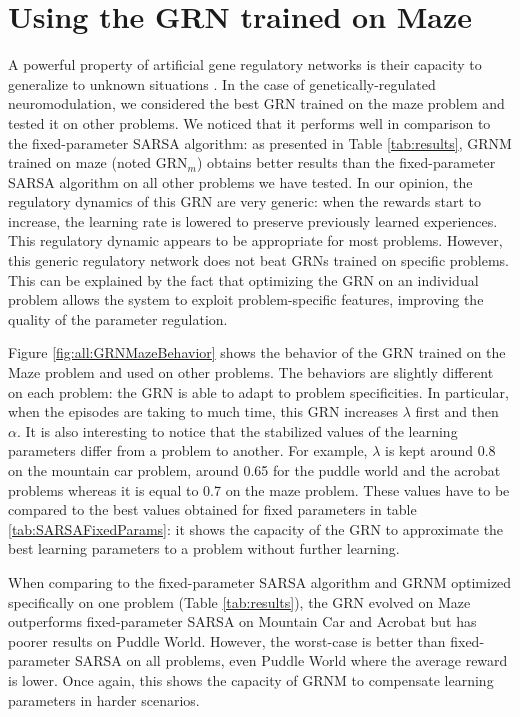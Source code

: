 \section{Using the GRN trained on Maze}
A powerful property of artificial gene regulatory networks is their capacity to generalize to unknown situations \cite{sanchez2014gene}. In the case of genetically-regulated neuromodulation, we considered the best GRN trained on the maze problem and tested it on other problems. We noticed that it performs well in comparison to the fixed-parameter SARSA algorithm: as presented in Table \ref{tab:results}, GRNM trained on maze (noted GRN$_{m}$) obtains better results than the fixed-parameter SARSA algorithm on all other problems we have tested. In our opinion, the regulatory dynamics of this GRN are very generic: when the rewards start to increase, the learning rate is lowered to preserve previously learned experiences. This regulatory dynamic appears to be appropriate for most problems. However, this generic regulatory network does not beat GRNs trained on specific problems. This can be explained by the fact that optimizing the GRN on an individual problem allows the system to exploit problem-specific features, improving the quality of the parameter regulation.

Figure \ref{fig:all:GRNMazeBehavior} shows the behavior of the GRN trained on the Maze problem and used on other problems. The behaviors are slightly different on each problem: the GRN is able to adapt to problem specificities. In particular, when the episodes are taking to much time, this GRN increases $\lambda$ first and then $\alpha$. It is also interesting to notice that the stabilized values of the learning parameters differ from a problem to another. For example, $\lambda$ is kept around 0.8 on the mountain car problem, around 0.65 for the puddle world and the acrobat problems whereas it is equal to 0.7 on the maze problem. These values have to be compared to the best values obtained for fixed parameters in table \ref{tab:SARSAFixedParams}: it shows the capacity of the GRN to approximate the best learning parameters to a problem without further learning.

When comparing to the fixed-parameter SARSA algorithm and GRNM optimized specifically on one problem (Table \ref{tab:results}), the GRN evolved on Maze outperforms fixed-parameter SARSA on Mountain Car and Acrobat but has poorer results on Puddle World. However, the worst-case is better than fixed-parameter SARSA on all problems, even Puddle World where the average reward is lower. Once again, this shows the capacity of GRNM to compensate learning parameters in harder scenarios.

